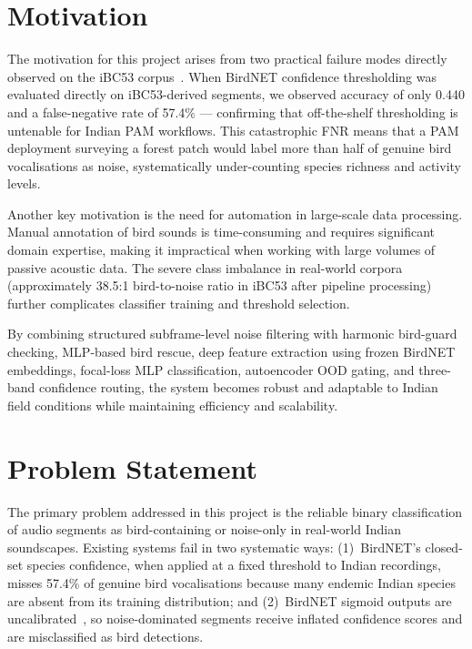 \documentclass[a4paper,12pt]{article}
\begin{document}
\section{Motivation}

\noindent
The motivation for this project arises from two practical failure modes directly observed on the
iBC53 corpus~\cite{iBC53}. When BirdNET confidence thresholding was evaluated directly on iBC53-derived
segments, we observed accuracy of only 0.440 and a false-negative rate of 57.4\% --- confirming that
off-the-shelf thresholding is untenable for Indian PAM workflows. This catastrophic FNR means that
a PAM deployment surveying a forest patch would label more than half of genuine bird vocalisations
as noise, systematically under-counting species richness and activity levels.

\vspace{0.3cm}

\noindent
Another key motivation is the need for automation in large-scale data processing. Manual annotation
of bird sounds is time-consuming and requires significant domain expertise, making it impractical
when working with large volumes of passive acoustic data. The severe class imbalance in real-world
corpora (approximately 38.5:1 bird-to-noise ratio in iBC53 after pipeline processing) further
complicates classifier training and threshold selection.

\vspace{0.3cm}

\noindent
By combining structured subframe-level noise filtering with harmonic bird-guard checking, MLP-based
bird rescue, deep feature extraction using frozen BirdNET embeddings, focal-loss MLP classification,
autoencoder OOD gating, and three-band confidence routing, the system becomes robust and adaptable
to Indian field conditions while maintaining efficiency and scalability.

\section{Problem Statement}

\noindent
The primary problem addressed in this project is the reliable binary classification of audio segments
as bird-containing or noise-only in real-world Indian soundscapes. Existing systems fail in two
systematic ways: (1)~BirdNET's closed-set species confidence, when applied at a fixed threshold to
Indian recordings, misses 57.4\% of genuine bird vocalisations because many endemic Indian species
are absent from its training distribution; and (2)~BirdNET sigmoid outputs are uncalibrated~\cite{WoodKahl},
so noise-dominated segments receive inflated confidence scores and are misclassified as bird detections.
\end{document}
